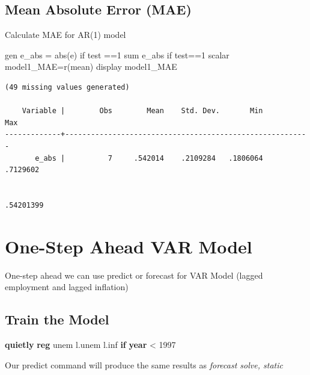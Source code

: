 \documentclass[
]{book}
\newenvironment{Shaded}{\begin{snugshade}}{\end{snugshade}}
\newcommand{\FunctionTok}[1]{\textcolor[rgb]{0.13,0.29,0.53}{\textbf{#1}}}
\newcommand{\KeywordTok}[1]{\textcolor[rgb]{0.13,0.29,0.53}{\textbf{#1}}}
\newcommand{\NormalTok}[1]{#1}
\newcommand{\OtherTok}[1]{\textcolor[rgb]{0.56,0.35,0.01}{#1}}
\begin{document}
\subsection*{Mean Absolute Error (MAE)}\label{mean-absolute-error-mae}

Calculate MAE for AR(1) model

\begin{Shaded}
\begin{Highlighting}[]
\NormalTok{gen e\_abs = abs(e) if test ==1}
\NormalTok{sum e\_abs if test==1}
\NormalTok{scalar model1\_MAE=\textasciigrave{}r(mean)\textquotesingle{}}
\NormalTok{display model1\_MAE}
\end{Highlighting}
\end{Shaded}

\begin{verbatim}
(49 missing values generated)

    Variable |        Obs        Mean    Std. Dev.       Min        Max
-------------+---------------------------------------------------------
       e_abs |          7     .542014    .2109284   .1806064   .7129602


.54201399
\end{verbatim}

\section{One-Step Ahead VAR Model}\label{one-step-ahead-var-model}

One-step ahead we can use predict or forecast for VAR Model (lagged employment and lagged inflation)

\subsection*{Train the Model}\label{train-the-model-1}

\begin{Shaded}
\begin{Highlighting}[]
\KeywordTok{quietly} \KeywordTok{reg}\NormalTok{ unem }\OtherTok{l}\NormalTok{.unem }\OtherTok{l}\NormalTok{.inf }\KeywordTok{if} \FunctionTok{year}\NormalTok{ \textless{} 1997}
\end{Highlighting}
\end{Shaded}

Our predict command will produce the same results as \emph{forecast solve, static}
\end{document}
